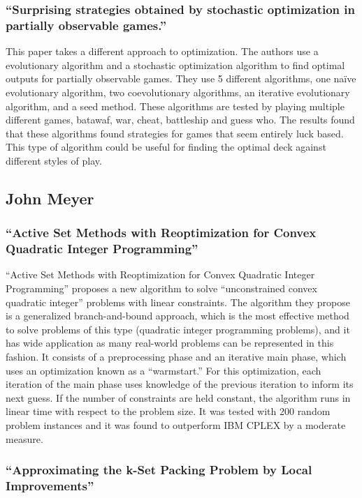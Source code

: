 \documentclass[12pt, letterpaper]{article}
\begin{document}
\subsubsection{\enquote{Surprising strategies obtained by stochastic optimization in partially observable games.}}

This paper takes a different approach to optimization.
The authors use a evolutionary algorithm and a stochastic optimization algorithm
to find optimal outputs for partially observable games.
They use 5 different algorithms, one naïve evolutionary algorithm, two coevolutionary algorithms,
an iterative evolutionary algorithm, and a seed method.
These algorithms are tested by playing multiple different games, batawaf, war, cheat, battleship and guess who.
The results found that these algorithms found strategies for games that seem entirely luck based.
This type of algorithm could be useful for finding the optimal deck against different styles of play.

\subsection{John Meyer}

\subsubsection{\enquote{Active Set Methods with Reoptimization for Convex Quadratic Integer Programming}}

\enquote{Active Set Methods with Reoptimization for Convex Quadratic Integer Programming}
proposes a new algorithm to solve \enquote{unconstrained convex quadratic integer}
problems with linear constraints.
The algorithm they propose is a generalized branch-and-bound approach,
which is the most effective method to solve problems of this type (quadratic integer programming problems),
and it has wide application as many real-world problems can be represented in this fashion.
It consists of a preprocessing phase and an iterative main phase,
which uses an optimization known as a \enquote{warmstart.}
For this optimization,
each iteration of the main phase uses knowledge of the previous iteration to inform its next guess.
If the number of constraints are held constant,
the algorithm runs in linear time with respect to the problem size.
It was tested with 200 random problem instances and it was found to outperform IBM CPLEX by a moderate measure.

\subsubsection{\enquote{Approximating the k-Set Packing Problem by Local Improvements}}
\end{document}
